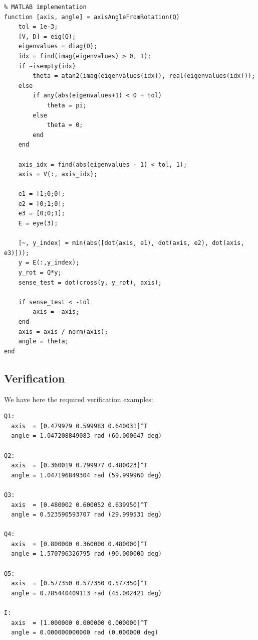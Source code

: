\documentclass[11pt]{article}
\begin{document}
\begin{verbatim}
% MATLAB implementation
function [axis, angle] = axisAngleFromRotation(Q)
    tol = 1e-3;
    [V, D] = eig(Q);
    eigenvalues = diag(D);
    idx = find(imag(eigenvalues) > 0, 1);
    if ~isempty(idx)
        theta = atan2(imag(eigenvalues(idx)), real(eigenvalues(idx)));
    else
        if any(abs(eigenvalues+1) < 0 + tol)
            theta = pi;
        else
            theta = 0;
        end
    end
    
    axis_idx = find(abs(eigenvalues - 1) < tol, 1);
    axis = V(:, axis_idx);
    
    e1 = [1;0;0];
    e2 = [0;1;0];
    e3 = [0;0;1];
    E = eye(3);
    
    [~, y_index] = min(abs([dot(axis, e1), dot(axis, e2), dot(axis, e3)]));
    y = E(:,y_index);
    y_rot = Q*y;
    sense_test = dot(cross(y, y_rot), axis);
    
    if sense_test < -tol
        axis = -axis;
    end
    axis = axis / norm(axis);
    angle = theta;
end
\end{verbatim}

\subsection*{Verification}

We have here the required verification examples:

\begin{verbatim}
Q1:
  axis  = [0.479979 0.599983 0.640031]^T
  angle = 1.047208849083 rad (60.000647 deg)

Q2:
  axis  = [0.360019 0.799977 0.480023]^T
  angle = 1.047196849304 rad (59.999960 deg)

Q3:
  axis  = [0.480002 0.600052 0.639950]^T
  angle = 0.523590593707 rad (29.999531 deg)

Q4:
  axis  = [0.800000 0.360000 0.480000]^T
  angle = 1.570796326795 rad (90.000000 deg)

Q5:
  axis  = [0.577350 0.577350 0.577350]^T
  angle = 0.785440409113 rad (45.002421 deg)

I:
  axis  = [1.000000 0.000000 0.000000]^T
  angle = 0.000000000000 rad (0.000000 deg)
\end{verbatim}

\end{document}
